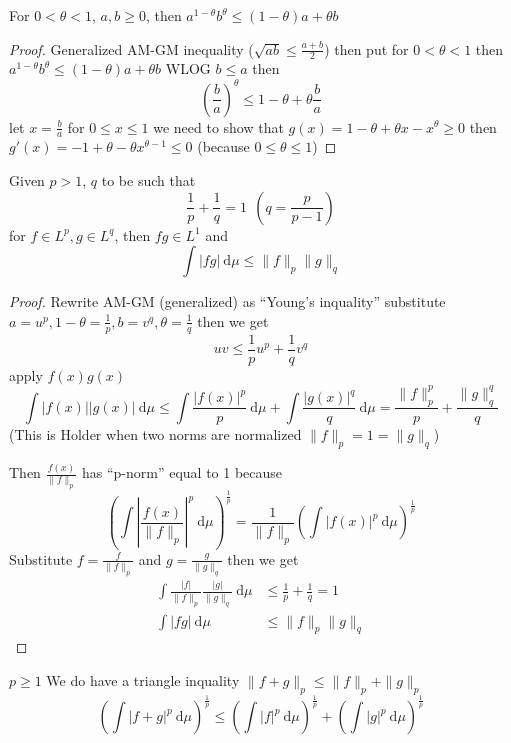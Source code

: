 \begin{claim}
  For $0 < \theta < 1$, $a, b \ge 0$, then $a^{1-\theta}b^\theta \le (1-\theta)a + \theta b$
\end{claim}

\begin{proof}
  Generalized AM-GM inequality ($\sqrt{ab}\le \frac{a+b}{2}$)
  then put for $0 < \theta < 1$ then $a^{1 -\theta}b^\theta \le (1-\theta)a + \theta b$ 
  WLOG $b \le a$ then \[\left(\frac ba\right)^\theta \le 1 - \theta + \theta\frac ba\]
  let $x = \frac ba$ for $0 \le x \le 1$ we need to show that $g(x) = 1- \theta + \theta x - x^\theta \ge 0$
  then $g'(x) = -1 + \theta -\theta x^{\theta - 1} \le 0$ (because $0 \le \theta \le 1$)
\end{proof}

\begin{claim}
  Given $p > 1$, $q$ to be such that 
  \[\frac1{p}+\frac1q = 1\ \ \left(q = \frac p{p-1}\right)\]
  for $f \in L^p, g \in L^{q}$, then $fg \in L^1$ and
  \[\int |fg| \ \mathrm{d}\mu \le \|f\|_p\|g\|_{q}\]
\end{claim}

\begin{proof}
  Rewrite AM-GM (generalized) as ``Young's inquality'' substitute $a = u^p, 1-\theta = \frac1p, b = v^{q}, \theta = \frac1{q}$
  then we get 
  \[uv \le \frac1pu^p + \frac1{q}v^{q}\]
  apply $f(x)g(x)$
  \[\int |f(x)||g(x)|\ \mathrm{d}\mu \le \int \frac{|f(x)|^p}{p} \ \mathrm{d}\mu + \int \frac{|g(x)|^{q}}{q}\ \mathrm{d}\mu = \frac{\|f\|_p^p}{p} + \frac{\|g\|_{q}^{q}}{q}\]
  (This is Holder when two norms are normalized $\|f\|_p = 1 = \|g\|_{q}$)

  Then $\frac{f(x)}{\|f\|_p}$ has ``p-norm'' equal to 1 because
  \[\left(\int \left|\frac{f(x)}{\|f\|_p}\right|^p \ \mathrm{d}\mu\right)^{\frac1p} = \frac{1}{\|f\|_p}\left(\int |f(x)|^p \ \mathrm{d}\mu\right)^{\frac1p}\]
  Substitute $f = \frac{f}{\|f\|_p}$ and $g = \frac{g}{\|g\|_{q}}$ then we get
  \begin{align*}
    \int \frac{|f|}{\|f\|_p}\frac{|g|}{\|g\|_{q}} \ \mathrm{d}\mu  &\le \frac1p + \frac1q = 1 \\
    \int |fg| \ \mathrm{d}\mu &\le \|f\|_p\|g\|_{q} 
  \end{align*}

\end{proof}
  
\begin{theorem}
  $p \ge 1$
  We do have a triangle inquality $\|f + g\|_p \le \|f\|_p + \|g\|_p$
  \[\left(\int |f+g|^p\ \mathrm{d}\mu \right)^{\frac1p} \le \left(\int |f|^p\ \mathrm{d}\mu\right)^{\frac1p} + \left(\int |g|^p \ \mathrm{d}\mu\right)^{\frac1p}\]
\end{theorem}

